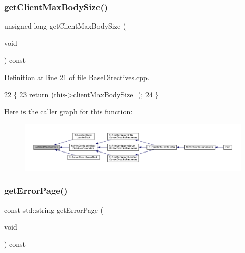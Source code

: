 \subsubsection{\texorpdfstring{get\+Client\+Max\+Body\+Size()}{getClientMaxBodySize()}}
{\footnotesize\ttfamily unsigned long get\+Client\+Max\+Body\+Size (\begin{DoxyParamCaption}\item[{void}]{ }\end{DoxyParamCaption}) const\hspace{0.3cm}{\ttfamily [inherited]}}



Definition at line 21 of file Base\+Directives.\+cpp.


\begin{DoxyCode}
22     \{
23         \textcolor{keywordflow}{return} (this->\hyperlink{classft_1_1_base_directives_ad65c2594d2a90ca065d410dfd4066a19}{clientMaxBodySize\_});
24     \}
\end{DoxyCode}
Here is the caller graph for this function\+:
\nopagebreak
\begin{figure}[H]
\begin{center}
\leavevmode
\includegraphics[width=350pt]{classft_1_1_base_directives_a930398ba1e4b99b2ba01a60dcda0c923_icgraph}
\end{center}
\end{figure}
\mbox{\label{classft_1_1_base_directives_a3cb0c21f17781de392d5ee09d7190caf}} 
\subsubsection{\texorpdfstring{get\+Error\+Page()}{getErrorPage()}}
{\footnotesize\ttfamily const std\+::string get\+Error\+Page (\begin{DoxyParamCaption}\item[{void}]{ }\end{DoxyParamCaption}) const\hspace{0.3cm}{\ttfamily [inherited]}}



